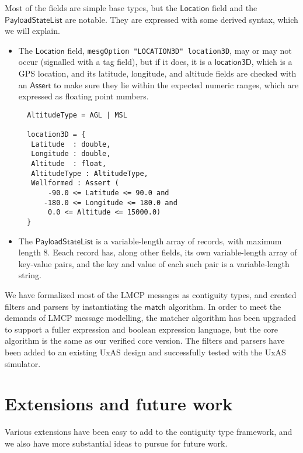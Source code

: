 \documentclass[a4paper,UKenglish,cleveref, autoref, thm-restate]{lipics-v2021}
\newcommand{\konst}[1]{\ensuremath{\mathsf{#1}}}
\begin{document}
Most of the fields are simple base types, but the \konst{Location}
field and the \konst{PayloadStateList} are notable. They are expressed
with some derived syntax, which we will explain.

\begin{itemize}
\item The \konst{Location} field,
  {\small\verb+mesgOption "LOCATION3D" location3D+}, may or may not
  occur (signalled with a tag field), but if it does, it is a
  \konst{location3D}, which is a GPS location, and its latitude,
  longitude, and altitude fields are checked with an \konst{Assert} to
  make sure they lie within the expected numeric ranges, which are
  expressed as floating point numbers.

{\small
\begin{verbatim}
  AltitudeType = AGL | MSL

  location3D = {
   Latitude  : double,
   Longitude : double,
   Altitude  : float,
   AltitudeType : AltitudeType,
   Wellformed : Assert (
       -90.0 <= Latitude <= 90.0 and
      -180.0 <= Longitude <= 180.0 and
       0.0 <= Altitude <= 15000.0)
  }
\end{verbatim}}

\item The \konst{PayloadStateList} is a variable-length array of
  records, with maximum length 8. Eeach record has, along other fields,
  its own variable-length array of key-value pairs, and the key and
  value of each such pair is a variable-length string.

\end{itemize}

We have formalized most of the LMCP messages as contiguity types, and
created filters and parsers by instantiating the \konst{match}
algorithm. In order to meet the demands of LMCP message modelling, the
matcher algorithm has been upgraded to support a fuller expression and
boolean expression language, but the core algorithm is the same as our
verified core version. The filters and parsers have been added to an
existing UxAS design and successfully tested with the UxAS simulator.

\section{Extensions and future work}

Various extensions have been easy to add to the contiguity type
framework, and we also have more substantial ideas to pursue for
future work.
\end{document}
